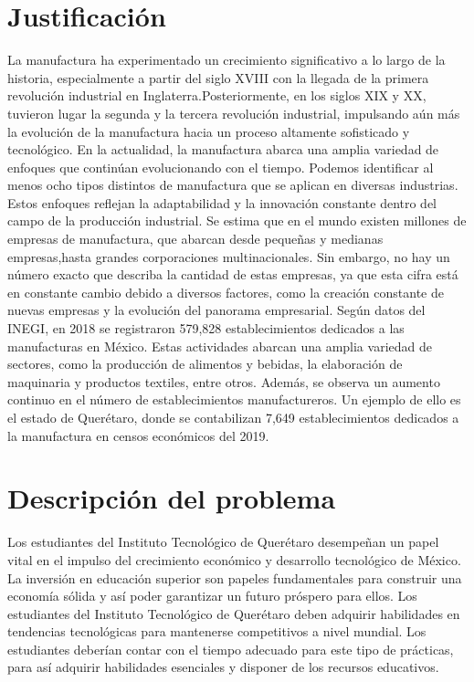    \section{Justificación}
    La manufactura ha experimentado un crecimiento significativo a lo largo de la historia, especialmente a partir del siglo XVIII con la llegada de la primera revolución industrial en Inglaterra.Posteriormente, en los siglos XIX y XX, tuvieron lugar la segunda y la tercera revolución industrial, impulsando aún más la evolución de la manufactura hacia un proceso altamente sofisticado y tecnológico. En la actualidad, la manufactura abarca una amplia variedad de enfoques que continúan evolucionando con el tiempo. Podemos identificar al menos ocho tipos distintos de manufactura que se aplican en diversas industrias. Estos enfoques reflejan la adaptabilidad y la innovación constante dentro del campo de la producción industrial. \cite{Revoluciónindustrial}
    Se estima que en el mundo existen millones de empresas de manufactura, que abarcan desde pequeñas y medianas empresas,hasta grandes corporaciones multinacionales. Sin embargo, no hay un número exacto que describa la cantidad de estas empresas, ya que esta cifra está en constante cambio debido a diversos factores, como la creación constante de nuevas empresas y la evolución del panorama empresarial.
    Según datos del INEGI, en 2018 se registraron 579,828 establecimientos dedicados a las manufacturas en México. Estas actividades abarcan una amplia variedad de sectores, como la producción de alimentos y bebidas, la elaboración de maquinaria y productos textiles, entre otros. \cite{Cuéntamedemexico}
    Además, se observa un aumento continuo en el número de establecimientos manufactureros. Un ejemplo de ello es el estado de Querétaro, donde se contabilizan 7,649 establecimientos dedicados a la manufactura en censos económicos del 2019.
    \section{Descripción del problema}
    Los estudiantes del Instituto Tecnológico de Querétaro desempeñan un papel vital en el impulso del crecimiento económico y desarrollo tecnológico de México. La inversión en educación superior son papeles fundamentales para construir una economía sólida y así poder garantizar un futuro próspero para ellos.
    Los estudiantes del Instituto Tecnológico de Querétaro deben adquirir habilidades en tendencias tecnológicas para mantenerse competitivos a nivel mundial.
    Los estudiantes deberían contar con el tiempo adecuado para este tipo de prácticas, para así adquirir habilidades esenciales y disponer de los recursos educativos. 
